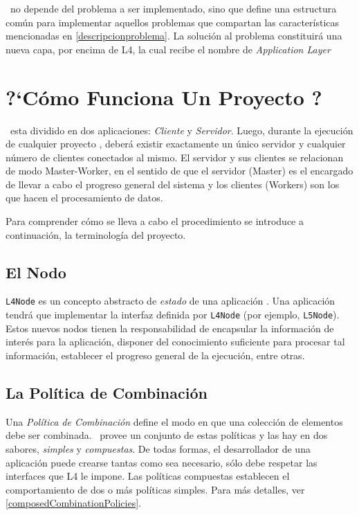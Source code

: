 		\combeng \ no depende del problema a ser implementado, sino que define una estructura com\'un para implementar aquellos problemas que compartan las 
		caracter\'isticas mencionadas en \ref{descripcionproblema}. La soluci\'on al problema constituir\'a una nueva capa, por encima de L4, la cual recibe el nombre 
		de \textit{Application Layer}

    \section{?`C\'omo Funciona Un Proyecto \combeng?}
        \combeng \ esta dividido en dos aplicaciones: \textit{Cliente} y \textit{Servidor}. Luego, durante la ejecuci\'on de cualquier proyecto
        \combeng, deber\'a existir exactamente un \'unico servidor y cualquier n\'umero de clientes conectados al mismo. El servidor y sus clientes se
        relacionan de modo Master-Worker, en el sentido de que el servidor (Master) es el encargado de llevar a cabo el progreso general del sistema
        y los clientes (Workers) son los que hacen el procesamiento de datos.
        
        Para comprender c\'omo se lleva a cabo el procedimiento se introduce a continuaci\'on, la terminolog\'ia del proyecto.
        \subsection{El Nodo}\label{nodoL4}
            \texttt{L4Node} es un concepto abstracto de \textit{estado} de una aplicaci\'on \combeng. Una aplicaci\'on tendr\'a que implementar la interfaz 
            definida por \texttt{L4Node} (por ejemplo, \texttt{L5Node}). Estos nuevos nodos tienen la responsabilidad de encapsular la informaci\'on de 
            inter\'es para la aplicaci\'on, disponer del conocimiento suficiente para procesar tal informaci\'on, establecer el progreso general de la
            ejecuci\'on, entre otras.

        \subsection{La Pol\'itica de Combinaci\'on}
            Una \textit{Pol\'itica de Combinaci\'on} define el modo en que una colecci\'on de elementos debe ser combinada. \combeng \ provee un conjunto de estas 
            pol\'iticas y las hay en dos sabores, \textit{simples} y \textit{compuestas}. De todas formas, el desarrollador de una aplicaci\'on puede crearse 
            tantas como sea necesario, s\'olo debe respetar las interfaces que L4 le impone. Las pol\'iticas compuestas establecen el comportamiento de dos o m\'as
            pol\'iticas simples. Para m\'as detalles, ver \ref{composedCombinationPolicies}.
            
